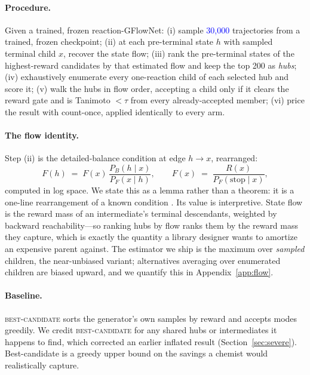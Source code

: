 \documentclass{article}
\newcommand{\checkval}[1]{\textcolor{blue}{#1}}
\begin{document}
\paragraph{Procedure.}
Given a trained, frozen reaction-GFlowNet:
(i) sample \checkval{30{,}000} trajectories from a trained, frozen checkpoint; (ii) at each pre-terminal state $h$ with sampled terminal child $x$, recover the state flow; (iii) rank the pre-terminal states of the highest-reward candidates by that estimated flow and keep the top 200 as \emph{hubs}; (iv) exhaustively enumerate every one-reaction child of each selected hub and score it; (v) walk the hubs in flow order, accepting a child only if it clears the reward gate and is Tanimoto $<\tau$ from every already-accepted member; (vi) price the result with count-once, applied identically to every arm.

\paragraph{The flow identity.}
Step (ii) is the detailed-balance condition at edge $h \to x$, rearranged:
\begin{equation}
F(h) \;=\; F(x)\,\frac{P_B(h \mid x)}{P_F(x \mid h)},
\qquad
F(x) \;=\; \frac{R(x)}{P_F(\text{stop} \mid x)},
\end{equation}
computed in log space. We state this as a lemma rather than a theorem: it is a one-line rearrangement of a known condition \citep{bengio2023gflownetfoundations,malkin2022trajectorybalance}. Its value is
interpretive. State flow is the reward mass of an intermediate's terminal descendants, weighted by backward reachability---so ranking hubs by flow ranks them by the reward mass they capture, which is exactly the quantity a library designer wants to amortize an expensive parent against. The estimator we ship is the maximum over \emph{sampled} children, the near-unbiased variant; alternatives averaging over enumerated children are biased upward, and we quantify this in Appendix~\ref{app:flow}.

\paragraph{Baseline.}
\textsc{best-candidate} sorts the generator's own samples by reward and accepts modes greedily. We credit \textsc{best-candidate} for any shared hubs or intermediates it happens to find, which corrected an earlier inflated result (Section~\ref{sec:severe}). Best-candidate is a greedy upper bound on the savings a chemist would realistically capture.
\end{document}
